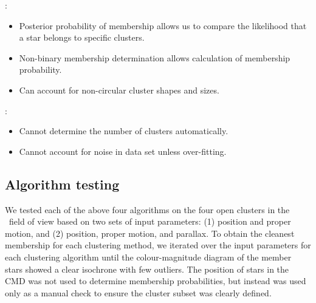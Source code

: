 : 
\begin{itemize}
    \item Posterior probability of membership allows us to compare the likelihood that a star belongs to specific clusters.
    \item Non-binary membership determination allows calculation of membership probability.
    \item Can account for non-circular cluster shapes and sizes.
\end{itemize} 

: 
\begin{itemize}
    \item Cannot determine the number of clusters automatically.
    \item Cannot account for noise in data set unless over-fitting.
\end{itemize}

\subsection{Algorithm testing}

We tested each of the above four algorithms on the four open clusters in the \Kepler~field of view based on two sets of input parameters: (1) position and proper motion, and (2) position, proper motion, and parallax. To obtain the cleanest membership for each clustering method, we iterated over the input parameters for each clustering algorithm until the colour-magnitude diagram of the member stars showed a clear isochrone with few outliers. The position of stars in the CMD was not used to determine membership probabilities, but instead was used only as a manual check to ensure the cluster subset was clearly defined.

